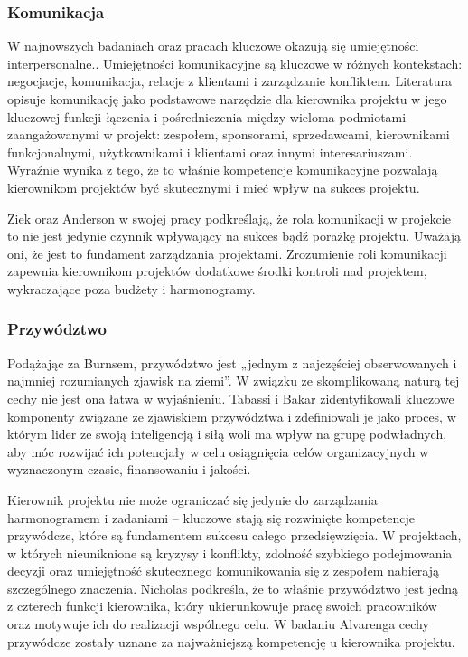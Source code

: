 \subsubsection{Komunikacja}
W najnowszych badaniach oraz pracach kluczowe okazują się umiejętności interpersonalne.\autocite{brill}. Umiejętności komunikacyjne są kluczowe w różnych kontekstach: negocjacje, komunikacja, relacje z klientami i zarządzanie konfliktem. Literatura opisuje komunikację jako podstawowe narzędzie dla kierownika projektu w jego kluczowej funkcji łączenia i pośredniczenia między wieloma podmiotami zaangażowanymi w projekt: zespołem, sponsorami, sprzedawcami, kierownikami funkcjonalnymi, użytkownikami i klientami oraz innymi interesariuszami. Wyraźnie wynika z tego, że to właśnie kompetencje komunikacyjne pozwalają kierownikom projektów być skutecznymi i mieć wpływ na sukces projektu. \autocite{Alvarenga}

Ziek oraz Anderson w swojej pracy podkreślają, że rola komunikacji w projekcie to nie jest jedynie czynnik wpływający na sukces bądź porażkę projektu. Uważają oni, że jest to fundament zarządzania projektami. Zrozumienie roli komunikacji zapewnia kierownikom projektów dodatkowe środki kontroli nad projektem, wykraczające poza budżety i harmonogramy.\autocite{ziek}

\subsubsection{Przywództwo}
Podążając za Burnsem, przywództwo jest „jednym z najczęściej obserwowanych i najmniej rozumianych zjawisk na ziemi”\autocite{burns}. W związku ze skomplikowaną naturą tej cechy nie jest ona łatwa w wyjaśnieniu. Tabassi i Bakar zidentyfikowali kluczowe komponenty związane ze zjawiskiem przywództwa i zdefiniowali je jako proces, w którym lider ze swoją inteligencją i siłą woli ma wpływ na grupę podwładnych, aby móc rozwijać ich potencjały w celu osiągnięcia celów organizacyjnych w wyznaczonym czasie, finansowaniu i jakości.\autocite{Tabassi} 

Kierownik projektu nie może ograniczać się jedynie do zarządzania harmonogramem i zadaniami – kluczowe stają się rozwinięte kompetencje przywódcze, które są fundamentem sukcesu całego przedsięwzięcia. W projektach, w których nieuniknione są kryzysy i konflikty, zdolność szybkiego podejmowania decyzji oraz umiejętność skutecznego komunikowania się z zespołem nabierają szczególnego znaczenia. Nicholas podkreśla, że to właśnie przywództwo jest jedną z czterech funkcji kierownika, który ukierunkowuje pracę swoich pracowników oraz motywuje ich do realizacji wspólnego celu. \autocite{NicholasSteyn} 
W badaniu Alvarenga cechy przywódcze zostały uznane za najważniejszą kompetencję u kierownika projektu.\autocite{Alvarenga}

